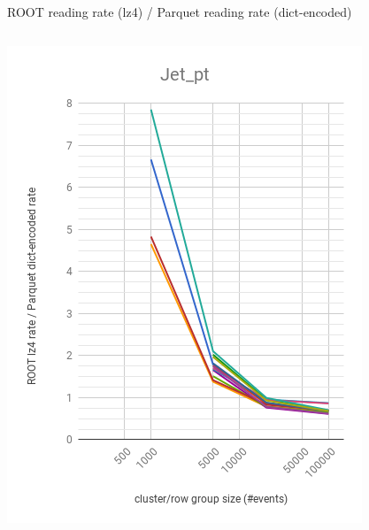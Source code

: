 \documentclass[aspectratio=169]{beamer}
\begin{document}
\begin{frame}{ROOT reading rate (lz4) / Parquet reading rate (dict-encoded)}
\begin{columns}
\begin{center}
\includegraphics[width=\linewidth]{root-lz4-parquet-dict-Jet_pt.png}
\end{center}
\begin{center}

\end{center}
\end{columns}
\end{frame}
\end{document}
